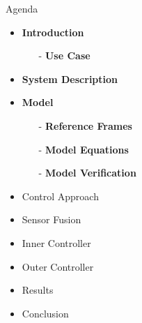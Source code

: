 
\begin{frame}{Agenda}{}
    \begin{itemize}
        \item \textcolor{aaublue}{\textbf{Introduction}}
        \begin{itemize}
            \item[-] \textcolor{aaublue}{\textbf{Use Case}}
        \end{itemize}
        \item \textcolor{aaublue}{\textbf{System Description}}
        \item \textcolor{aaublue}{\textbf{Model}}
        \begin{itemize}
             \item[-] \textcolor{aaublue}{\textbf{Reference Frames}}
             \item[-] \textcolor{aaublue}{\textbf{Model Equations}}
             \item[-] \textcolor{aaublue}{\textbf{Model Verification}}
        \end{itemize}
        \item Control Approach
        \item Sensor Fusion
        \item Inner Controller
        \item Outer Controller
        \item Results
        \item Conclusion
    \end{itemize}
\end{frame}